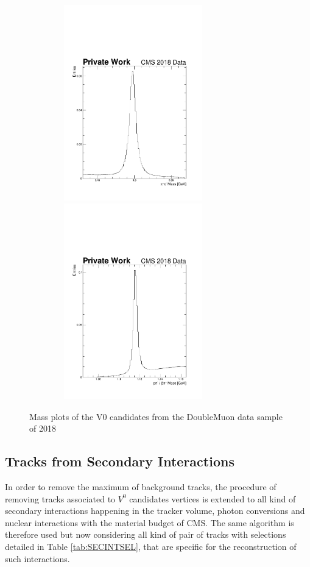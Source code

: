 \documentclass{cernatlasnote}
\begin{document}
        
\begin{figure}[ht]
\hspace{-1.4cm}
\includegraphics[height=8.5cm, width=9cm, trim= 0cm 0cm 0cm 0.cm,clip]{images/V0Candidates/DoubleMuon_UL2018_MiniAODv2_GT36-v1_hData_reco_K0_mass_.pdf}\includegraphics[height=8.5cm, width=9cm, trim= 0cm 0cm 0cm 0.cm,clip]{images/V0Candidates/DoubleMuon_UL2018_MiniAODv2_GT36-v1_hData_reco_L0_mass_.pdf}
\caption{\label{fig:V0Candidates} Mass plots of the V0 candidates from the DoubleMuon data sample of 2018}
\end{figure}


        
    \subsection{Tracks from Secondary Interactions}

        In order to remove the maximum of background tracks, the procedure of removing tracks associated to $V^0$ candidates vertices is extended to all kind of secondary interactions happening in the tracker volume, photon conversions and nuclear interactions with the material budget of CMS. The same algorithm is therefore used but now considering all kind of pair of tracks with selections detailed in Table \ref{tab:SECINTSEL}, that are specific for the reconstruction of such interactions.\\
\end{document}
